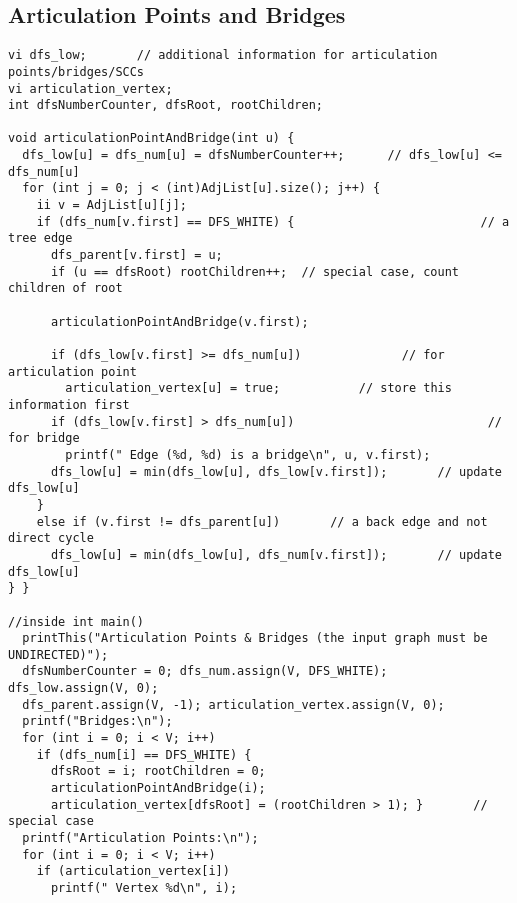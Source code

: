 \documentclass[letterpaper]{article}
\begin{document}
\subsection{Articulation Points and Bridges}
\begin{lstlisting}
vi dfs_low;       // additional information for articulation points/bridges/SCCs
vi articulation_vertex;
int dfsNumberCounter, dfsRoot, rootChildren;

void articulationPointAndBridge(int u) {
  dfs_low[u] = dfs_num[u] = dfsNumberCounter++;      // dfs_low[u] <= dfs_num[u]
  for (int j = 0; j < (int)AdjList[u].size(); j++) {
    ii v = AdjList[u][j];
    if (dfs_num[v.first] == DFS_WHITE) {                          // a tree edge
      dfs_parent[v.first] = u;
      if (u == dfsRoot) rootChildren++;  // special case, count children of root

      articulationPointAndBridge(v.first);

      if (dfs_low[v.first] >= dfs_num[u])              // for articulation point
        articulation_vertex[u] = true;           // store this information first
      if (dfs_low[v.first] > dfs_num[u])                           // for bridge
        printf(" Edge (%d, %d) is a bridge\n", u, v.first);
      dfs_low[u] = min(dfs_low[u], dfs_low[v.first]);       // update dfs_low[u]
    }
    else if (v.first != dfs_parent[u])       // a back edge and not direct cycle
      dfs_low[u] = min(dfs_low[u], dfs_num[v.first]);       // update dfs_low[u]
} }

//inside int main()
  printThis("Articulation Points & Bridges (the input graph must be UNDIRECTED)");
  dfsNumberCounter = 0; dfs_num.assign(V, DFS_WHITE); dfs_low.assign(V, 0);
  dfs_parent.assign(V, -1); articulation_vertex.assign(V, 0);
  printf("Bridges:\n");
  for (int i = 0; i < V; i++)
    if (dfs_num[i] == DFS_WHITE) {
      dfsRoot = i; rootChildren = 0;
      articulationPointAndBridge(i);
      articulation_vertex[dfsRoot] = (rootChildren > 1); }       // special case
  printf("Articulation Points:\n");
  for (int i = 0; i < V; i++)
    if (articulation_vertex[i])
      printf(" Vertex %d\n", i);
\end{lstlisting}
\newpage
\end{document}
